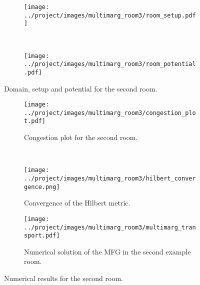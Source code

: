 \documentclass[../report.tex]{subfiles}
\begin{document}
\begin{figure}[h]
	\centering
	\begin{subfigure}[c]{.4\linewidth}
		\texttt{[image: ../project/images/multimarg\_room3/room\_setup.pdf]}	
	\end{subfigure}~
	\begin{subfigure}[c]{.45\linewidth}
		\texttt{[image: ../project/images/multimarg\_room3/room\_potential.pdf]}	
	\end{subfigure}
	\caption{Domain, setup and potential for the second room.}\label{fig:Room3}
\end{figure}

\begin{figure}[h]
	\centering
	\begin{subfigure}[c]{.4\linewidth}
		\texttt{[image: ../project/images/multimarg\_room3/congestion\_plot.pdf]}\caption{Congestion plot for the second room.}
	\end{subfigure}~
	\begin{subfigure}[c]{.4\linewidth}
		\texttt{[image: ../project/images/multimarg\_room3/hilbert\_convergence.png]}
		\caption{Convergence of the Hilbert metric.}
	\end{subfigure}
	\begin{subfigure}[c]{.8\linewidth}
		\texttt{[image: ../project/images/multimarg\_room3/multimarg\_transport.pdf]}
		\caption{Numerical solution of the MFG in the second example room.}\label{fig:NMargEx3}
	\end{subfigure}
	\caption{Numerical results for the second room.}\label{fig:Room3Results}
\end{figure}
\end{document}
